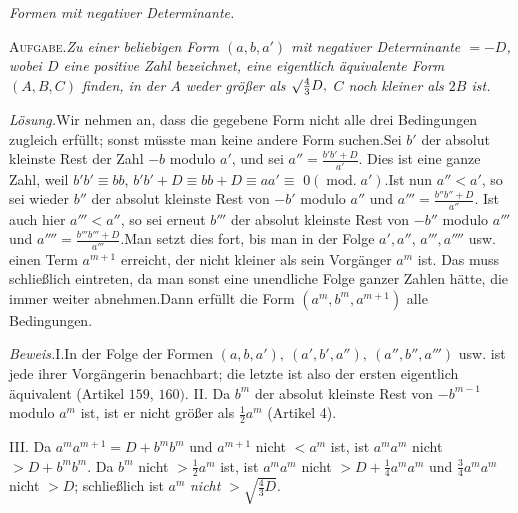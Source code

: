\begin{center}\emph{Formen mit negativer Determinante.}\end{center}


\textsc{Aufgabe.}\quad \emph{Zu einer beliebigen Form $(a,b,a')$ mit negativer Determinante $=-D$, wobei $D$ eine positive Zahl bezeichnet, eine eigentlich äquivalente Form $(A,B,C)$ finden, in der $A$ weder größer als $\surd\tfrac43D,$ $C$ noch kleiner als $2B$ ist.}

\emph{Lösung.}\quad Wir nehmen an, dass die gegebene Form nicht alle drei Bedingungen zugleich erfüllt; sonst müsste man keine andere Form suchen.\quad Sei $b'$ der absolut kleinste Rest der Zahl $-b$ modulo $a'$, und sei $a''=\frac{b'b'+D}{a'}$. Dies ist eine ganze Zahl, weil $b'b'\equiv bb$, $b'b'+D\equiv bb+D\equiv aa'\equiv$ $0(\operatorname{mod.}a').$\quad Ist nun $a''<a'$, so sei wieder $b''$ der absolut kleinste Rest von $-b'$ modulo $a''$ und $a'''=\frac{b''b''+D}{a''}$. Ist auch hier $a'''<a''$, so sei erneut $b'''$ der absolut kleinste Rest von $-b''$ modulo $a'''$ und $a''''=\frac{b'''b'''+D}{a'''}$.\quad Man setzt dies fort, bis man in der Folge $a',a''$, $a''',a''''$ usw. einen Term $a^{m+1}$ erreicht, der nicht kleiner als sein Vorgänger $a^m$ ist. Das muss schließlich eintreten, da man sonst eine unendliche Folge ganzer Zahlen hätte, die immer weiter abnehmen.\quad Dann erfüllt die Form $(a^m,b^m,a^{m+1})$ alle Bedingungen.

\emph{Beweis.}\quad I.\quad In der Folge der Formen $(a,b,a'),\ (a',b',a''),\ (a'',b'',a''')$ usw. ist jede ihrer Vorgängerin benachbart; die letzte ist also der ersten eigentlich äquivalent (Artikel $159$, $160).$
II. Da $b^m$ der absolut kleinste Rest von $-b^{m-1}$ modulo $a^m$ ist, ist er nicht größer als $\frac12 a^m$ (Artikel 4).

III. Da $a^m a^{m+1}=D+b^m b^m$ und $a^{m+1}$ nicht $<a^m$ ist, ist $a^m a^m$ nicht $>D+b^m b^m$. Da $b^m$ nicht $>\frac12 a^m$ ist, ist $a^m a^m$ nicht $>D+\frac14 a^m a^m$ und $\frac34 a^m a^m$ nicht $>D$; schließlich ist $a^m$ \emph{nicht} $>\surd{\frac43 D}$.


